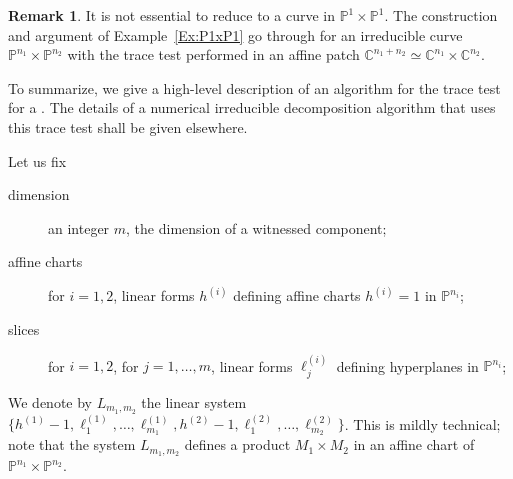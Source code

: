 \documentclass[12pt]{amsart}
\theoremstyle{definition}
\newtheorem{remark}[theorem]{Remark}
\begin{document}
\begin{remark}\label{remark:trace-test-for-curve}
It is not essential to reduce to a curve in ${{\mathbb{P}}}^1\times{{\mathbb{P}}}^1$.
The construction and argument of Example~\ref{Ex:P1xP1} go through for an irreducible curve ${{\mathbb{P}}}^{n_1}\times{{\mathbb{P}}}^{n_2}$
with the trace test performed in an affine patch ${{\mathbb{C}}}^{n_1+n_2} \simeq {{\mathbb{C}}}^{n_1}\times{{\mathbb{C}}}^{n_2}$.
\end{remark}
To summarize, we give a high-level description of an algorithm for the trace test for a {{{}}}.
The details of a numerical irreducible decomposition algorithm that uses this trace test shall be given elsewhere.

Let us fix\vspace{-3pt}
\begin{description}
\item[dimension] an integer $m$, the dimension of a witnessed component;
\item[affine charts] for $i=1,2$, linear forms $h^{(i)}$ defining affine charts $h^{(i)}=1$ in ${{\mathbb{P}}}^{n_i}$;
\item[slices] for $i=1,2$, for $j=1,\ldots,m$, linear forms $\ell^{(i)}_j$ defining hyperplanes in ${{\mathbb{P}}}^{n_i}$;
\end{description}
We denote by $L_{m_1,m_2}$ the linear system $\{h^{(1)}-1,\ell^{(1)}_1,\ldots,\ell^{(1)}_{m_1},h^{(2)}-1,\ell^{(2)}_1,\ldots,\ell^{(2)}_{m_2}\}$.
This is mildly technical; note that the system $L_{m_1,m_2}$ defines a product $M_1\times M_2$ in an affine
chart of ${{\mathbb{P}}}^{n_1}\times{{\mathbb{P}}}^{n_2}$.
\end{document}
